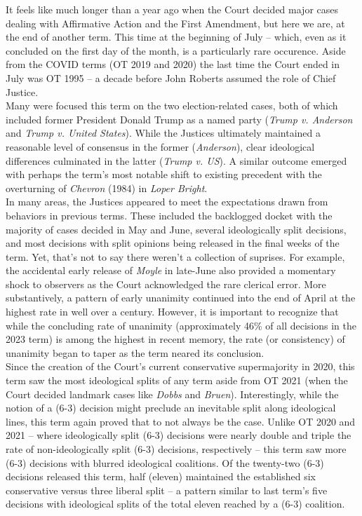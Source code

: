 
\noindent It feels like much longer than a year ago when the Court decided major cases dealing with Affirmative Action and the First Amendment, but here we are, at the end of another term. This time at the beginning of July -- which, even as it concluded on the first day of the month, is a particularly rare occurence. Aside from the COVID terms (OT 2019 and 2020) the last time the Court ended in July was OT 1995 -- a decade before John Roberts assumed the role of Chief Justice.  \\

Many were focused this term on the two election-related cases, both of which included former President Donald Trump as a named party (\emph{Trump v. Anderson} and \emph{Trump v. United States}). While the Justices ultimately maintained a reasonable level of consensus in the former (\emph{Anderson}), clear ideological differences culminated in the latter (\emph{Trump v. US}). A similar outcome emerged with perhaps the term's most notable shift to existing precedent with the overturning of \emph{Chevron} (1984) in \emph{Loper Bright}. \\

In many areas, the Justices appeared to meet the expectations drawn from behaviors in previous terms. These included the backlogged docket with the majority of cases decided in May and June, several ideologically split decisions, and most decisions with split opinions being released in the final weeks of the term. Yet, that's not to say there weren't a collection of suprises. For example, the accidental early release of \emph{Moyle} in late-June also provided a momentary shock to observers as the Court acknowledged the rare clerical error. More substantively, a pattern of early unanimity continued into the end of April at the highest rate in well over a century. However, it is important to recognize that while the concluding rate of unanimity (approximately 46\% of all decisions in the 2023 term) is among the highest in recent memory, the rate (or consistency) of unanimity began to taper as the term neared its conclusion. \\

Since the creation of the Court's current conservative supermajority in 2020, this term saw the most ideological splits of any term aside from OT 2021 (when the Court decided landmark cases like \emph{Dobbs} and \emph{Bruen}). Interestingly, while the notion of a (6-3) decision might preclude an inevitable split along ideological lines, this term again proved that to not always be the case. Unlike OT 2020 and 2021 -- where ideologically split (6-3) decisions were nearly double and triple the rate of non-ideologically split (6-3) decisions, respectively -- this term saw more (6-3) decisions with blurred ideological coalitions. Of the twenty-two (6-3) decisions released this term, half (eleven) maintained the established six conservative versus three liberal split -- a pattern similar to last term's five decisions with ideological splits of the total eleven reached by a (6-3) coalition. \\

